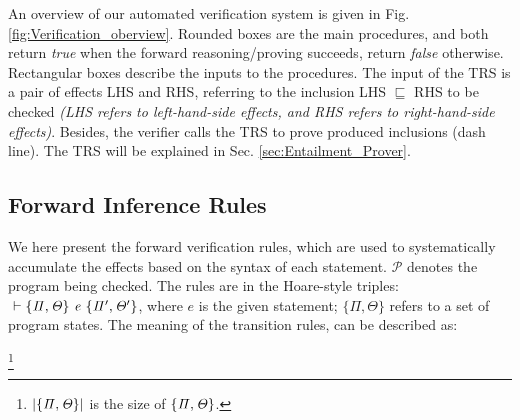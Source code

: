 \documentclass[acmsmall,10pt,review]{acmart}
\newcommand{\wbigcup}{\mathop{\widetilde{\bigcup}}\displaylimits}
\newcommand{\env}{\code{\mathcal{V}}}
\newcommand{\es}{\theta}
\newcommand{\code}[1]{{\tt{\ensuremath{\m{#1}}}}}
\newcommand{\CONTAIN}{\sqsubseteq}
\newcommand{\m}{\mathit}
\newcommand\figref[1]{Fig. \textcolor{black}{\ref{#1}}.}
\newcommand\secref[1]{Sec. \textcolor{black}{\ref{#1}}}
\begin{document}
{An overview of our automated verification system is given 
in \figref{fig:Verification_oberview} 
Rounded boxes are the main procedures, and both return \emph{true} 
when the forward reasoning/proving succeeds, return \emph{false} 
otherwise. Rectangular boxes describe the inputs to the procedures.
The input of the TRS is a pair of effects LHS and RHS, referring to the 
inclusion LHS \code{\CONTAIN} RHS to be checked 
\textit{(LHS refers to left-hand-side effects, and RHS refers to right-hand-side 
effects)}. 
Besides, the verifier calls the TRS to prove produced inclusions (dash line). 
The TRS will be explained in \secref{sec:Entailment_Prover}. 



\newcommand{\s}[1]{\code{\{ #1\}}}





 

\subsection{Forward Inference Rules}
\label{Forward_Rules}



 We here present the forward verification rules, 
which are used to systematically accumulate the effects based on 
the syntax of each statement.
\code{\mathcal{P}} denotes the program being checked. 
The rules are in the Hoare-style triples: 
\code{\ \vdash \s{ \Pi, \Theta } \ e\ 
\s{\Pi^\prime, \Theta^\prime}},  where 
$e$ is the given statement;
\s{ \Pi, \Theta } refers to a set of program states. 
The meaning of the transition rules, can be described as: 




\vspace{2mm}
\qquad\qquad\quad \code{\s{ \Pi^\prime, \Theta^\prime } = 
\wbigcup_{i{=}0}^{|\s{ \Pi, \Theta }| \text{-} 1}  
\s{\pi_i^\prime, \es_i^\prime} \ \ where\ \ 
 \vdash  \s{\pi_i, \es_i} \ e \ \s{\pi_i^\prime, \es_i^\prime}.} 
\footnote{\code{|\s{ \Pi, \Theta }|} is the 
size of \code{\s{ \Pi, \Theta }}.}
\vspace{3mm}


\begin{comment}
  

where 
\code{\Theta} is the current effects, 
\code{\Pi} is the current guard, 
and \s{\Pi_1, \Theta_1}  
is the resulting state by executing \code{e}. 
The program state is initialized using \s{\epsilon, True}. 
These rules transfer program states and systematically accumulate the effects syntactically. 


\end{comment}}
\end{document}
